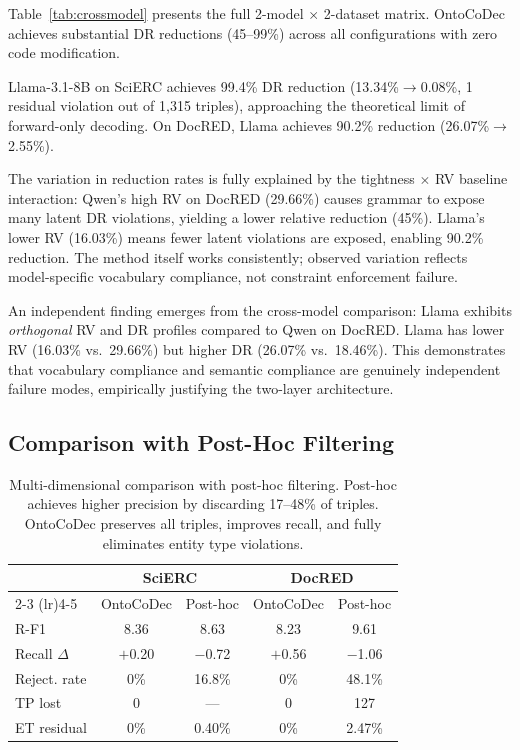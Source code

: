 \documentclass[11pt,a4paper]{article}
\newcommand{\sys}{OntoCoDec}
\begin{document}
Table~\ref{tab:crossmodel} presents the full 2-model $\times$ 2-dataset matrix.
\sys{} achieves substantial DR reductions (45--99\%) across all configurations with zero code modification.

Llama-3.1-8B on SciERC achieves 99.4\% DR reduction (13.34\%$\to$0.08\%, 1 residual violation out of 1,315 triples), approaching the theoretical limit of forward-only decoding.
On DocRED, Llama achieves 90.2\% reduction (26.07\%$\to$2.55\%).

The variation in reduction rates is fully explained by the tightness $\times$ RV baseline interaction:
Qwen's high RV on DocRED (29.66\%) causes grammar to expose many latent DR violations, yielding a lower relative reduction (45\%).
Llama's lower RV (16.03\%) means fewer latent violations are exposed, enabling 90.2\% reduction.
The method itself works consistently; observed variation reflects model-specific vocabulary compliance, not constraint enforcement failure.

An independent finding emerges from the cross-model comparison: Llama exhibits \emph{orthogonal} RV and DR profiles compared to Qwen on DocRED.
Llama has lower RV (16.03\% vs.\ 29.66\%) but higher DR (26.07\% vs.\ 18.46\%).
This demonstrates that vocabulary compliance and semantic compliance are genuinely independent failure modes, empirically justifying the two-layer architecture.

\subsection{Comparison with Post-Hoc Filtering}
\label{sec:posthoc}

\begin{table}[t]
\centering
\small
\begin{tabular}{lcccc}
\toprule
& \multicolumn{2}{c}{\textbf{SciERC}} & \multicolumn{2}{c}{\textbf{DocRED}} \\
\cmidrule(lr){2-3} \cmidrule(lr){4-5}
& \sys{} & Post-hoc & \sys{} & Post-hoc \\
\midrule
R-F1 & 8.36 & 8.63 & 8.23 & 9.61 \\
Recall $\Delta$ & $+$0.20 & $-$0.72 & $+$0.56 & $-$1.06 \\
Reject. rate & 0\% & 16.8\% & 0\% & 48.1\% \\
TP lost & 0 & --- & 0 & 127 \\
ET residual & 0\% & 0.40\% & 0\% & 2.47\% \\
\bottomrule
\end{tabular}
\caption{Multi-dimensional comparison with post-hoc filtering. Post-hoc achieves higher precision by discarding 17--48\% of triples. \sys{} preserves all triples, improves recall, and fully eliminates entity type violations.}
\label{tab:posthoc}
\end{table}
\end{document}
